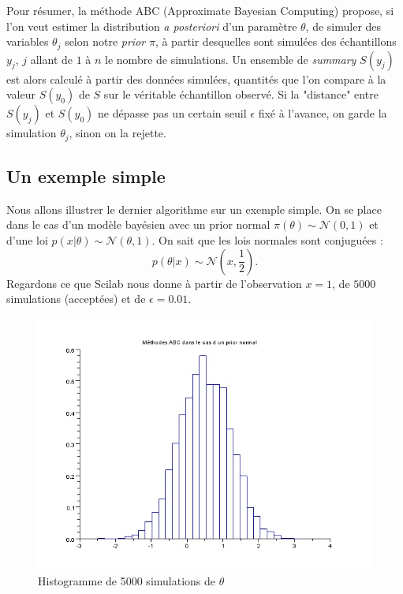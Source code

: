 \documentclass{article}
\theoremstyle{definition}
\begin{document}
Pour résumer, la méthode ABC (Approximate Bayesian Computing) propose, si l'on veut estimer la distribution \textit{a posteriori} d'un paramètre $\theta$, de simuler des variables $\theta_j$ selon notre \textit{prior} $\pi$, à partir desquelles sont simulées des échantillons $y_j$, $j$ allant de $1$ à $n$ le nombre de simulations. Un ensemble de \textit{summary} $S(y_j)$ est alors calculé à partir des données simulées, quantités que l'on compare à la valeur $S(y_0)$ de $S$ sur le véritable échantillon observé. Si la "distance" entre $S(y_j)$ et $S(y_0)$ ne dépasse pas un certain seuil $\epsilon$ fixé à l'avance, on garde la simulation $\theta_j$, sinon on la rejette.  

\subsection{Un exemple simple}

Nous allons illustrer le dernier algorithme sur un exemple simple. On se place dans le cas d'un modèle bayésien avec un prior normal $\pi(\theta)\sim \mathcal N(0,1)$ et d'une loi $p(x|\theta)\sim\mathcal N(\theta,1)$. On sait que les lois normales sont conjuguées :
\[p(\theta|x)\sim\mathcal N (x,\frac{1}{2}).\]
Regardons ce que Scilab nous donne à partir de l'observation $x=1$, de $5000$ simulations (acceptées) et de $\epsilon=0.01$.

\begin{figure}[h]\centering
\includegraphics[scale=0.6]{ABCnorm.jpg}
\caption{Histogramme de 5000 simulations de $\theta$}
\label{fig:ABCnorm}
\end{figure}
\end{document}
